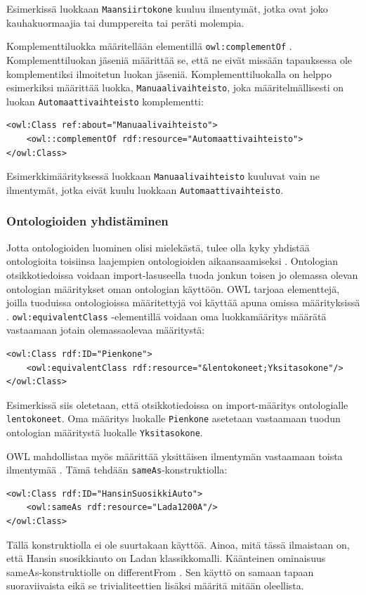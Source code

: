 \documentclass[finnish]{tktltiki2}
\theoremstyle{definition}
\theoremstyle{remark}
\begin{document}
Esimerkissä luokkaan \texttt{Maansiirtokone} kuuluu ilmentymät, jotka ovat joko kauhakuormaajia tai dumppereita tai peräti molempia.
 
Komplementtiluokka määritellään elementillä \texttt{owl:complementOf}  \cite{SWM04}. Komplementtiluokan jäseniä määrittää se, että ne eivät missään tapauksessa ole komplementiksi ilmoitetun luokan jäseniä. Komplementtiluokalla on helppo esimerkiksi määrittää luokka, \texttt{Manuaalivaihteisto}, joka määritelmällisesti on luokan \texttt{Automaattivaihteisto} komplementti:
\begin{verbatim}
<owl:Class ref:about="Manuaalivaihteisto">
    <owl::complementOf rdf:resource="Automaattivaihteisto">
</owl:Class>
\end{verbatim}
Esimerkkimäärityksessä luokkaan \texttt{Manuaalivaihteisto} kuuluvat vain ne ilmentymät, jotka eivät kuulu luokkaan \texttt{Automaattivaihteisto}. 

\subsubsection{Ontologioiden yhdistäminen}
Jotta ontologioiden luominen olisi mielekästä, tulee olla kyky yhdistää ontologioita toisiinsa laajempien ontologioiden aikaansaamiseksi \cite{SWM04}.  Ontologian otsikkotiedoissa voidaan import-lasuseella tuoda jonkun toisen jo olemassa olevan ontologian määritykset oman ontologian käyttöön. OWL tarjoaa elementtejä, joilla tuoduissa ontologioissa määritettyjä voi käyttää apuna omissa määrityksissä \cite{SWM04}.
\texttt{owl:equivalentClass} -elementillä voidaan oma luokkamääritys määrätä vastaamaan jotain olemassaolevaa määritystä: 
\begin{verbatim}
<owl:Class rdf:ID="Pienkone">
    <owl:equivalentClass rdf:resource="&lentokoneet;Yksitasokone"/>
</owl:Class>
\end{verbatim}
Esimerkissä siis oletetaan, että otsikkotiedoissa on import-määritys ontologialle \texttt{lentokoneet}. Oma määritys luokalle \texttt{Pienkone} asetetaan vastaamaan tuodun ontologian määritystä luokalle \texttt{Yksitasokone}. 

OWL mahdollistaa myös määrittää yksittäisen ilmentymän vastaamaan toista ilmentymää \cite{SWM04}. Tämä tehdään \texttt{sameAs}-konstruktiolla: 
\begin{verbatim}
<owl:Class rdf:ID="HansinSuosikkiAuto">
    <owl:sameAs rdf:resource="Lada1200A"/>
</owl:Class>
\end{verbatim}
Tällä konstruktiolla ei ole suurtakaan käyttöä. Ainoa, mitä tässä ilmaistaan on, että Hansin suosikkiauto on Ladan klassikkomalli. Käänteinen ominaisuus sameAs-konstruktiolle on differentFrom \cite{SWM04}. Sen käyttö on samaan tapaan suoraviivaista eikä se trivialiteettien lisäksi määritä mitään oleellista. 
\end{document}
